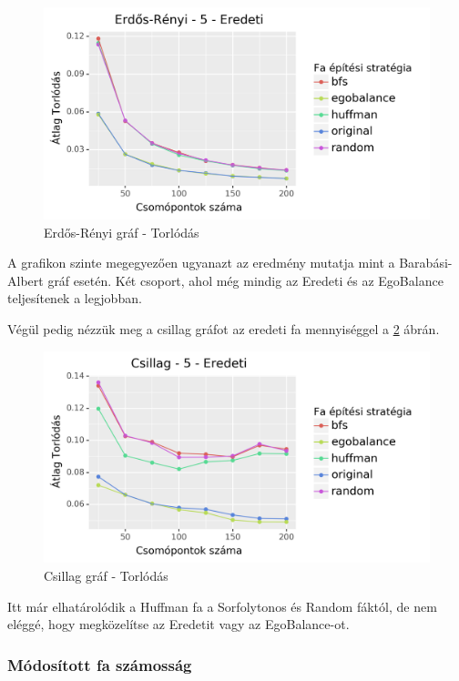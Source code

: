 \documentclass[12pt]{report}
\begin{document}
\begin{figure}[H]
	\begin{center}
		\includegraphics[width=0.9\linewidth]{pictures/erdos_con_e.png}
		\caption{Erdős-Rényi gráf - Torlódás}
		\label{erdos-con}
	\end{center}
\end{figure}

A grafikon szinte megegyezően ugyanazt az eredmény mutatja mint a Barabási-Albert gráf esetén.
Két csoport, ahol még mindig az Eredeti és az EgoBalance teljesítenek a legjobban.

Végül pedig nézzük meg a csillag gráfot az eredeti fa mennyiséggel a \ref{star-con} ábrán.

\begin{figure}[H]
	\begin{center}
		\includegraphics[width=0.9\linewidth]{pictures/star_con_e.png}
		\caption{Csillag gráf - Torlódás}
		\label{star-con}
	\end{center}
\end{figure}

Itt már elhatárolódik a Huffman fa a Sorfolytonos és Random fáktól, de nem eléggé, hogy megközelítse az Eredetit vagy az EgoBalance-ot.

\subsubsection{Módosított fa számosság}
\end{document}
